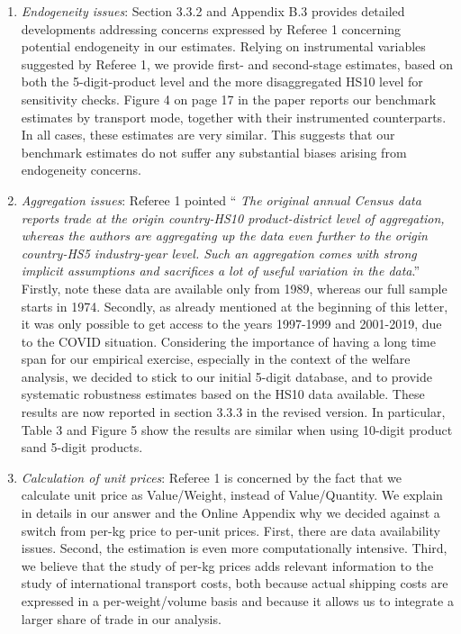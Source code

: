 \documentclass[12pt]{article}
\begin{document}
\begin{enumerate}


\item \emph{Endogeneity issues}: Section 3.3.2 and Appendix B.3 provides detailed developments addressing concerns expressed by Referee 1 concerning potential endogeneity in our estimates. Relying on instrumental variables suggested by Referee 1, we provide first- and second-stage estimates, based on both the 5-digit-product level and the more disaggregated HS10 level for sensitivity checks. Figure 4 on page 17 in the paper reports our benchmark estimates by transport mode, together with their instrumented counterparts. In all cases, these estimates are very similar. This suggests that our benchmark estimates do not suffer any substantial biases arising from endogeneity concerns.

\item \emph{Aggregation issues}: Referee 1 pointed `` \emph{The original annual Census data reports trade at the origin country-HS10 product-district level of aggregation, whereas the authors are aggregating up the data even further to the origin country-HS5 industry-year level. Such an aggregation comes with strong implicit assumptions and sacrifices a lot of useful variation in the data}.'' Firstly, note these data are available only from 1989, whereas our full sample starts in 1974. Secondly, as already mentioned at the beginning of this letter, it was only possible to get access to the years 1997-1999 and 2001-2019, due to the COVID situation. Considering the importance of having a long time span for our empirical exercise, especially in the context of the welfare analysis, we decided to stick to our initial 5-digit database, and to provide systematic robustness estimates based on the HS10 data available. These results are now reported in section 3.3.3 in the revised version. In particular, Table 3 and Figure 5 show the results are similar when using 10-digit product sand 5-digit products.

\item \emph{Calculation of unit prices}: Referee 1 is concerned by the fact that we calculate unit price as Value/Weight, instead of Value/Quantity. We explain in details in our answer and the Online Appendix why we decided against a switch from per-kg price to per-unit prices. First, there are data availability issues. Second, the estimation is even more computationally intensive. Third, we believe that the study of per-kg prices adds relevant information to the study of international transport costs, both because actual shipping costs are expressed in a per-weight/volume basis and because it allows us to integrate a larger share of trade in our analysis.

\end{enumerate}
\end{document}
